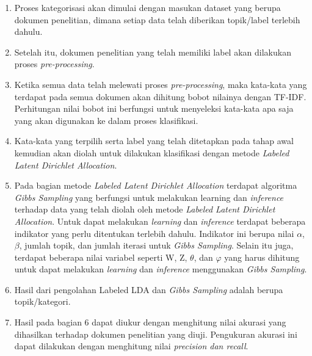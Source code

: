 \begin{enumerate}[nolistsep,leftmargin=0.5cm]
\item
Proses kategorisasi akan dimulai dengan masukan dataset yang berupa dokumen penelitian, dimana setiap data telah diberikan topik/label terlebih dahulu.
\item
Setelah itu, dokumen penelitian yang telah memiliki label akan dilakukan proses {\itshape pre-processing}. 
\item
Ketika semua data telah melewati proses {\itshape pre-processing}, maka kata-kata yang terdapat pada semua dokumen akan dihitung bobot nilainya dengan TF-IDF. Perhitungan nilai bobot ini berfungsi untuk menyeleksi kata-kata apa saja yang akan digunakan ke dalam proses klasifikasi.
\item
Kata-kata yang terpilih serta label yang telah ditetapkan pada tahap awal kemudian akan diolah untuk dilakukan klasifikasi dengan metode {\itshape Labeled Latent Dirichlet Allocation}.
\item
Pada bagian metode {\itshape Labeled Latent Dirichlet Allocation} terdapat algoritma {\itshape Gibbs Sampling} yang berfungsi untuk melakukan learning dan {\itshape inference} terhadap data yang telah diolah oleh metode {\itshape Labeled Latent Dirichlet Allocation}. Untuk dapat melakukan {\itshape learning} dan {\itshape inference} terdapat beberapa indikator yang perlu ditentukan terlebih dahulu. Indikator ini berupa nilai $\alpha$, $\beta$, jumlah topik, dan jumlah iterasi untuk {\itshape Gibbs Sampling}. Selain itu juga, terdapat beberapa nilai variabel seperti W, Z, $\theta$, dan $\varphi$ yang harus dihitung untuk dapat melakukan {\itshape learning} dan {\itshape inference} menggunakan {\itshape Gibbs Sampling}. 
\item
Hasil dari pengolahan Labeled LDA dan {\itshape Gibbs Sampling} adalah berupa topik/kategori.
\item
Hasil pada bagian 6 dapat diukur dengan menghitung nilai akurasi yang dihasilkan terhadap dokumen penelitian yang diuji. Pengukuran akurasi ini dapat dilakukan dengan menghitung nilai {\itshape precision dan recall}.
\end{enumerate}

